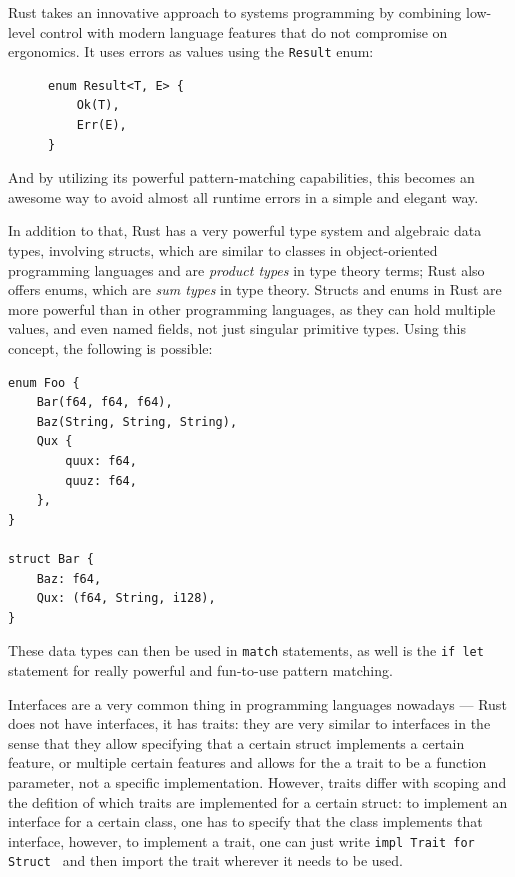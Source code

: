 Rust takes an innovative approach to systems programming by combining low-level control with modern language features
that do not compromise on ergonomics. It uses errors as values using the \texttt{Result} enum:

\begin{figure}[H]
    \begin{verbatim}
enum Result<T, E> {
    Ok(T),
    Err(E),
}
    \end{verbatim}
\end{figure}

And by utilizing its powerful pattern-matching capabilities, this becomes an awesome way to avoid almost all runtime errors
in a simple and elegant way.

In addition to that, Rust has a very powerful type system and algebraic data types, involving structs, which are similar to classes
in object-oriented programming languages and are \textit{product types} in type theory terms; Rust also offers enums, which
are \textit{sum types} in type theory. Structs and enums in Rust are more powerful than in other programming languages,
as they can hold multiple values, and even named fields, not just singular primitive types.
Using this concept, the following is possible:
\begin{verbatim}
enum Foo {
    Bar(f64, f64, f64),
    Baz(String, String, String),
    Qux {
        quux: f64,
        quuz: f64,
    },
}

struct Bar {
    Baz: f64,
    Qux: (f64, String, i128),
}
\end{verbatim}

These data types can then be used in \texttt{match} statements, as well is the \texttt{if let} statement
for really powerful and fun-to-use pattern matching.

Interfaces are a very common thing in programming languages nowadays ---
Rust does not have interfaces, it has traits: they are very similar to interfaces
in the sense that they allow specifying that a certain struct implements a certain feature,
or multiple certain features and allows for the a trait to be a function parameter,
not a specific implementation. However, traits differ with scoping and the defition of which traits are implemented for a certain struct:
to implement an interface for a certain class, one has to specify that the class implements that interface,
however, to implement a trait, one can just write \texttt{impl Trait for Struct {}} and then import the trait wherever it needs to be used.

